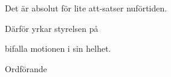 \documentclass[../main/handlingar.tex]{subfiles}
\begin{document}
\motionssvar

Det är absolut för lite att-satser nuförtiden.

Därför yrkar styrelsen på
\begin{attsatser}
    \att bifalla motionen i sin helhet.
\end{attsatser}

\begin{signatures}{1}
    \ist
    \signature{\ordf}{Ordförande}
\end{signatures}
\end{document}
